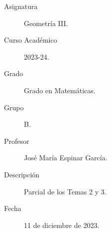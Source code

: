 \documentclass[12pt]{article}
\begin{document}

    
    

    \begin{description}
        \item[Asignatura] Geometría III.
        \item[Curso Académico] 2023-24.
        \item[Grado] Grado en Matemáticas.
        \item[Grupo] B.
        \item[Profesor] José María Espinar García.
        \item[Descripción] Parcial de los Temas 2 y 3.
        \item[Fecha] 11 de diciembre de 2023.
    
    \end{description}
    \newpage
    
\end{document}
